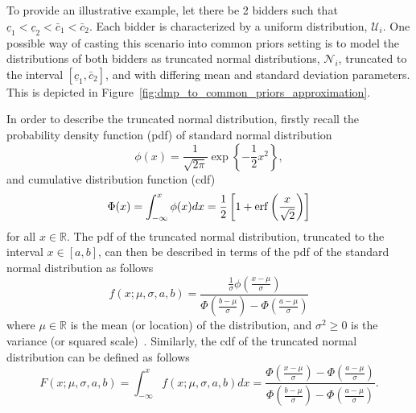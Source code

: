 To provide an illustrative example, let there be 2 bidders such that $\underline{c}_1 < \underline{c}_2 < \bar{c}_1 < \bar{c}_2$. Each bidder is characterized by a uniform distribution, $\mathcal{U}_i$. One possible way of casting this scenario into common priors setting is to model the distributions of both bidders as truncated normal distributions, $\mathcal{N}_i$, truncated to the interval $[\underline{c}_1, \bar{c}_2]$, and with differing mean and standard deviation parameters. This is depicted in Figure~\ref{fig:dmp_to_common_priors_approximation}.

In order to describe the truncated normal distribution, firstly recall the probability density function (pdf) of standard normal distribution
\begin{equation}
  \label{eq:pdf_standard_normal_approximation}
  \displaystyle\phi(x) = \frac{1}{\sqrt{2\pi}} \exp\left\{-\frac{1}{2}x^2\right\},
\end{equation}
and cumulative distribution function (cdf)
\begin{equation}
  \label{eq:cdf_standard_normal_approximation}
  \displaystyle\Phi(x) = \int_{-\infty}^{x}\phi(x)dx = \frac{1}{2}\left[ 1 + \operatorname{erf}\left(\frac{x}{\sqrt{2}}\right) \right]
\end{equation}
for all $x\in\mathbb{R}$. The pdf of the truncated normal distribution, truncated to the interval $x\in[a,b]$, can then be described in terms of the pdf of the standard normal distribution as follows
\begin{equation}
  \label{eq:pdf_truncated_normal_approximation}
  \displaystyle f(x; \mu, \sigma, a, b) = \frac{\frac{1}{\sigma}\phi\left(\frac{x-\mu}{\sigma}\right)}{\Phi\left(\frac{b-\mu}{\sigma}\right) - \Phi\left(\frac{a-\mu}{\sigma}\right)}
\end{equation}
where $\mu\in\mathbb{R}$ is the mean (or location) of the distribution, and $\sigma^2\geq 0$ is the variance (or squared scale)~\cite{JohnsonNormal1994,Cohen1991}. Similarly, the cdf of the truncated normal distribution can be defined as follows
\begin{equation}
  \label{eq:cdf_truncated_normal_approximation}
  \displaystyle F(x; \mu, \sigma, a, b) = \int_{-\infty}^{x}f(x;\mu,\sigma,a,b)dx
  = \frac{\Phi\left(\frac{x-\mu}{\sigma}\right) - \Phi\left(\frac{a-\mu}{\sigma}\right)}{\Phi\left(\frac{b-\mu}{\sigma}\right) - \Phi\left(\frac{a-\mu}{\sigma}\right)}.
\end{equation}

